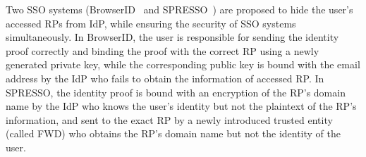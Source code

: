 




Two SSO systems (BrowserID~\cite{persona} and SPRESSO~\cite{SPRESSO}) are proposed to hide the user's accessed RPs from IdP, while ensuring the security of SSO systems simultaneously. In BrowserID, the user is responsible for sending the identity proof correctly and binding the proof with the correct RP using a newly generated private key, while the corresponding public key is bound with the email address by the IdP who fails to obtain the information of accessed RP. In SPRESSO, the identity proof is bound with an encryption of the RP's domain name by the IdP who knows the user's identity but not the plaintext of the RP's information, and sent to the exact RP by a newly introduced trusted entity (called FWD) who obtains the RP's domain name but not the identity of the user. 

